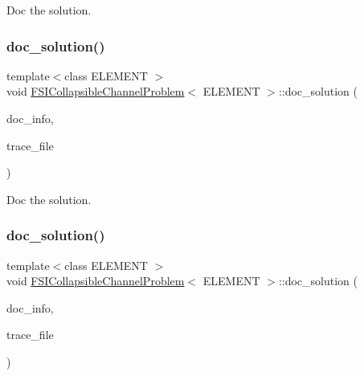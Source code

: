 Doc the solution. 

\mbox{\label{classFSICollapsibleChannelProblem_aff5cacbc8d81f6c1beda947085496462}} 
\subsubsection{\texorpdfstring{doc\+\_\+solution()}{doc\_solution()}\hspace{0.1cm}{\footnotesize\ttfamily [3/4]}}
{\footnotesize\ttfamily template$<$class E\+L\+E\+M\+E\+NT $>$ \\
void \hyperlink{classFSICollapsibleChannelProblem}{F\+S\+I\+Collapsible\+Channel\+Problem}$<$ E\+L\+E\+M\+E\+NT $>$\+::doc\+\_\+solution (\begin{DoxyParamCaption}\item[{Doc\+Info \&}]{doc\+\_\+info,  }\item[{ofstream \&}]{trace\+\_\+file }\end{DoxyParamCaption})}



Doc the solution. 

\mbox{\label{classFSICollapsibleChannelProblem_aff5cacbc8d81f6c1beda947085496462}} 
\subsubsection{\texorpdfstring{doc\+\_\+solution()}{doc\_solution()}\hspace{0.1cm}{\footnotesize\ttfamily [4/4]}}
{\footnotesize\ttfamily template$<$class E\+L\+E\+M\+E\+NT $>$ \\
void \hyperlink{classFSICollapsibleChannelProblem}{F\+S\+I\+Collapsible\+Channel\+Problem}$<$ E\+L\+E\+M\+E\+NT $>$\+::doc\+\_\+solution (\begin{DoxyParamCaption}\item[{Doc\+Info \&}]{doc\+\_\+info,  }\item[{ofstream \&}]{trace\+\_\+file }\end{DoxyParamCaption})}



